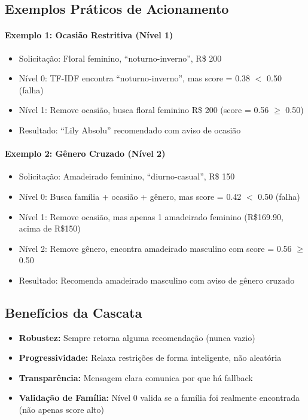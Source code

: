 \documentclass[12pt,a4paper]{article}
\begin{document}
\subsection{Exemplos Práticos de Acionamento}

\paragraph{Exemplo 1: Ocasião Restritiva (Nível 1)}
\begin{itemize}
    \item Solicitação: Floral feminino, ``noturno-inverno'', R\$ 200
    \item Nível 0: TF-IDF encontra ``noturno-inverno'', mas score = 0.38 $<$ 0.50 (falha)
    \item Nível 1: Remove ocasião, busca floral feminino R\$ 200 (score = 0.56 $\geq$ 0.50)
    \item Resultado: ``Lily Absolu'' recomendado com aviso de ocasião
\end{itemize}

\paragraph{Exemplo 2: Gênero Cruzado (Nível 2)}
\begin{itemize}
    \item Solicitação: Amadeirado feminino, ``diurno-casual'', R\$ 150
    \item Nível 0: Busca família + ocasião + gênero, mas score = 0.42 $<$ 0.50 (falha)
    \item Nível 1: Remove ocasião, mas apenas 1 amadeirado feminino (R\$169.90, acima de R\$150)
    \item Nível 2: Remove gênero, encontra amadeirado masculino com score = 0.56 $\geq$ 0.50
    \item Resultado: Recomenda amadeirado masculino com aviso de gênero cruzado
\end{itemize}

\subsection{Benefícios da Cascata}

\begin{itemize}
    \item \textbf{Robustez:} Sempre retorna alguma recomendação (nunca vazio)
    \item \textbf{Progressividade:} Relaxa restrições de forma inteligente, não aleatória
    \item \textbf{Transparência:} Mensagem clara comunica por que há fallback
    \item \textbf{Validação de Família:} Nível 0 valida se a família foi realmente encontrada (não apenas score alto)
\end{itemize}
\end{document}
